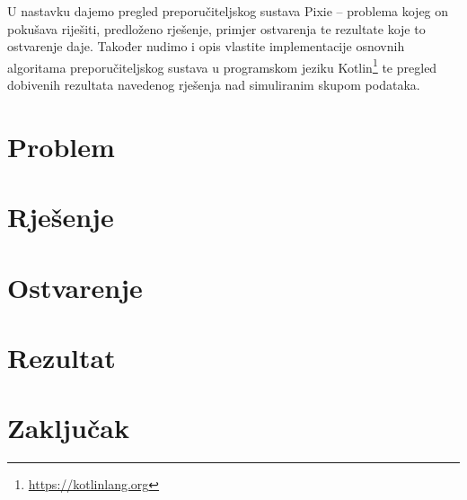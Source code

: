 \documentclass[times, utf8, seminar]{fer}
\begin{document}
U nastavku dajemo pregled preporučiteljskog sustava Pixie -- problema kojeg on pokušava riješiti, predloženo rješenje, primjer ostvarenja te rezultate koje to ostvarenje daje. Također nudimo i opis vlastite implementacije osnovnih algoritama preporučiteljskog sustava u programskom jeziku Kotlin\footnote{\url{https://kotlinlang.org}} te pregled dobivenih rezultata navedenog rješenja nad simuliranim skupom podataka.

\chapter{Problem}

\chapter{Rješenje}

\chapter{Ostvarenje}

\chapter{Rezultat}

\chapter{Zaključak}



\end{document}
